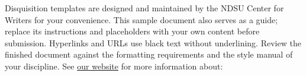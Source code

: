 




Disquisition templates are designed and maintained by the NDSU Center for Writers for your convenience. This sample document also serves as a guide; replace its instructions and placeholders with your own content before submission. Hyperlinks and URLs use black text without underlining. Review the finished document against the formatting requirements and the style manual of your discipline. See \href{https://www.ndsu.edu/cfwriters/disquisitions}{our website} for more information about:


